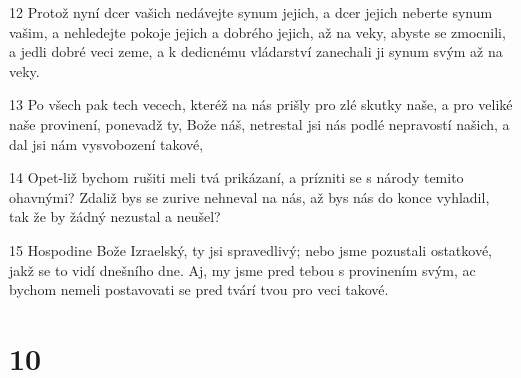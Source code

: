 \par 12 Protož nyní dcer vašich nedávejte synum jejich, a dcer jejich neberte synum vašim, a nehledejte pokoje jejich a dobrého jejich, až na veky, abyste se zmocnili, a jedli dobré veci zeme, a k dedicnému vládarství zanechali ji synum svým až na veky.
\par 13 Po všech pak tech vecech, kteréž na nás prišly pro zlé skutky naše, a pro veliké naše provinení, ponevadž ty, Bože náš, netrestal jsi nás podlé nepravostí našich, a dal jsi nám vysvobození takové,
\par 14 Opet-liž bychom rušiti meli tvá prikázaní, a prízniti se s národy temito ohavnými? Zdaliž bys se zurive nehneval na nás, až bys nás do konce vyhladil, tak že by žádný nezustal a neušel?
\par 15 Hospodine Bože Izraelský, ty jsi spravedlivý; nebo jsme pozustali ostatkové, jakž se to vidí dnešního dne. Aj, my jsme pred tebou s provinením svým, ac bychom nemeli postavovati se pred tvárí tvou pro veci takové.

\chapter{10}

